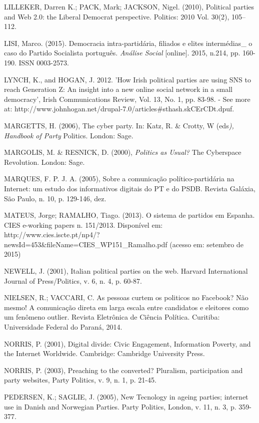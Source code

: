LILLEKER, Darren K.; PACK, Mark; JACKSON, Nigel. (2010), Political
parties and Web 2.0: the Liberal Democrat perspective. Politics: 2010
Vol. 30(2), 105--112.

LISI, Marco. (2015). Democracia intra-partidária, filiados e elites
intermédias\_ o caso do Partido Socialista português. \emph{Análise
Social} {[}online{]}. 2015, n.214, pp. 160-190. ISSN 0003-2573.

LYNCH, K., and HOGAN, J. 2012. 'How Irish political parties are using
SNS to reach Generation Z: An insight into a new online social network
in a small democracy', Irish Communications Review, Vol. 13, No. 1, pp.
83-98. - See more at:
http://www.johnhogan.net/drupal-7.0/articles\#sthash.skCErCDt.dpuf.

MARGETTS, H. (2006), The cyber party. In: Katz, R. \& Crotty, W
(eds\emph{), Handbook of Party} Politics. London: Sage.

MARGOLIS, M. \& RESNICK, D. (2000), \emph{Politics as Usual?} The
Cyberspace Revolution. London: Sage.

MARQUES, F. P. J. A. (2005), Sobre a comunicação político-partidária na
Internet: um estudo dos informativos digitais do PT e do PSDB. Revista
Galáxia, São Paulo, n. 10, p. 129-146, dez.

MATEUS, Jorge; RAMALHO, Tiago. (2013). O sistema de partidos em Espanha.
CIES e-working papers n. 151/2013. Disponível em:
http://www.cies.iscte.pt/np4/?newsId=453\&fileName=CIES\_WP151\_Ramalho.pdf
(acesso em: setembro de 2015)

NEWELL, J. (2001), Italian political parties on the web. Harvard
International Journal of Press/Politics, v. 6, n. 4, p. 60-87.

NIELSEN, R.; VACCARI, C. As pessoas curtem os politicos no Facebook? Não
mesmo! A comunicação direta em larga escala entre candidatos e eleitores
como um fenômeno outlier. Revista Eletrônica de Ciência Política.
Curitiba: Universidade Federal do Paraná, 2014.

NORRIS, P. (2001), Digital divide: Civic Engagement, Information
Poverty, and the Internet Worldwide. Cambridge: Cambridge University
Press.

NORRIS, P. (2003), Preaching to the converted? Pluralism, participation
and party websites, Party Politics, v. 9, n. 1, p. 21-45.

PEDERSEN, K.; SAGLIE, J. (2005), New Tecnology in ageing parties;
internet use in Danish and Norwegian Parties. Party Politics, London, v.
11, n. 3, p. 359-377.

